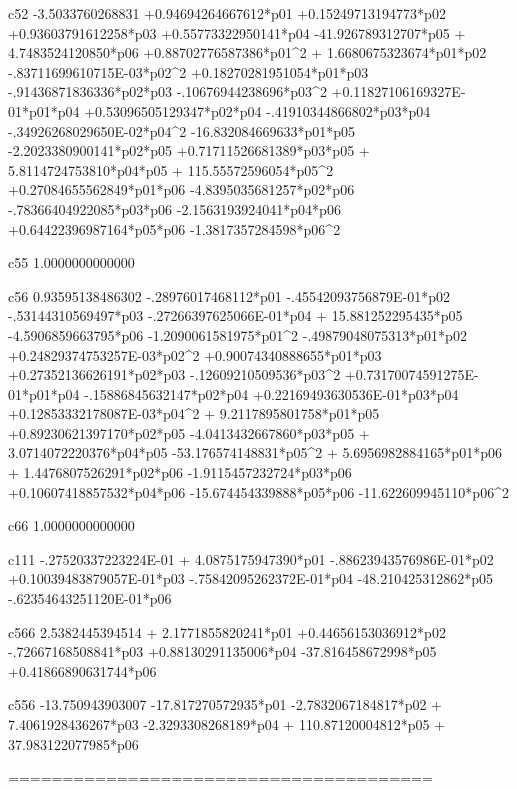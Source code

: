  c52
  -3.5033760268831 +0.94694264667612*p01 +0.15249713194773*p02 +0.93603791612258*p03 +0.55773322950141*p04  -41.926789312707*p05 + 4.7483524120850*p06 +0.88702776587386*p01^2 + 1.6680675323674*p01*p02  -.83711699610715E-03*p02^2 +0.18270281951054*p01*p03  -.91436871836336*p02*p03  -.10676944238696*p03^2 +0.11827106169327E-01*p01*p04 +0.53096505129347*p02*p04  -.41910344866802*p03*p04  -.34926268029650E-02*p04^2  -16.832084669633*p01*p05  -2.2023380900141*p02*p05 +0.71711526681389*p03*p05 + 5.8114724753810*p04*p05 + 115.55572596054*p05^2 +0.27084655562849*p01*p06  -4.8395035681257*p02*p06  -.78366404922085*p03*p06  -2.1563193924041*p04*p06 +0.64422396987164*p05*p06  -1.3817357284598*p06^2 
  
 c55
   1.0000000000000 
  
 c56
  0.93595138486302  -.28976017468112*p01  -.45542093756879E-01*p02  -.53144310569497*p03  -.27266397625066E-01*p04 + 15.881252295435*p05  -4.5906859663795*p06  -1.2090061581975*p01^2  -.49879048075313*p01*p02 +0.24829374753257E-03*p02^2 +0.90074340888655*p01*p03 +0.27352136626191*p02*p03  -.12609210509536*p03^2 +0.73170074591275E-01*p01*p04  -.15886845632147*p02*p04 +0.22169493630536E-01*p03*p04 +0.12853332178087E-03*p04^2 + 9.2117895801758*p01*p05 +0.89230621397170*p02*p05  -4.0413432667860*p03*p05 + 3.0714072220376*p04*p05  -53.176574148831*p05^2 + 5.6956982884165*p01*p06 + 1.4476807526291*p02*p06  -1.9115457232724*p03*p06 +0.10607418857532*p04*p06  -15.674454339888*p05*p06  -11.622609945110*p06^2 
  
 c66
   1.0000000000000 
  
 c111
  -.27520337223224E-01 + 4.0875175947390*p01  -.88623943576986E-01*p02 +0.10039483879057E-01*p03  -.75842095262372E-01*p04  -48.210425312862*p05  -.62354643251120E-01*p06 
  
 c566
   2.5382445394514 + 2.1771855820241*p01 +0.44656153036912*p02  -.72667168508841*p03 +0.88130291135006*p04  -37.816458672998*p05 +0.41866890631744*p06 
  
 c556
  -13.750943903007  -17.817270572935*p01  -2.7832067184817*p02 + 7.4061928436267*p03  -2.3293308268189*p04 + 110.87120004812*p05 + 37.983122077985*p06 
  
 =======================================

